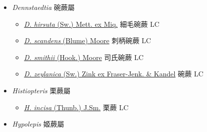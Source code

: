 
  \begin{itemize}
 \item[] \textit{Dennstaedtia} 碗蕨屬
                    
  \begin{itemize}
        \item[] \href{http://www.theplantlist.org/tpl1.1/search?q=Dennstaedtia+hirsuta}{\textit{D. hirsuta} (Sw.) Mett. ex Miq.}   細毛碗蕨 LC
        \item[] \href{http://www.theplantlist.org/tpl1.1/search?q=Dennstaedtia+scandens}{\textit{D. scandens} (Blume) Moore}   刺柄碗蕨 LC
        \item[] \href{http://www.theplantlist.org/tpl1.1/search?q=Dennstaedtia+smithii}{\textit{D. smithii} (Hook.) Moore}   司氏碗蕨 LC
        \item[] \href{http://www.theplantlist.org/tpl1.1/search?q=Dennstaedtia+zeylanica}{\textit{D. zeylanica} (Sw.) Zink ex Fraser-Jenk. \& Kandel}     碗蕨 LC
  \end{itemize}
 \item[] \textit{Histiopteris} 栗蕨屬
                    
  \begin{itemize}
        \item[] \href{http://www.theplantlist.org/tpl1.1/search?q=Histiopteris+incisa}{\textit{H. incisa} (Thunb.) J.Sm.}   栗蕨 LC
  \end{itemize}
 \item[] \textit{Hypolepis} 姬蕨屬
                    

\end{itemize}
